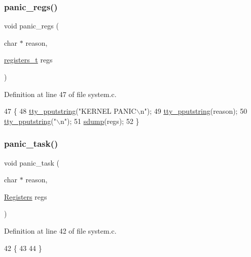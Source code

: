 \subsubsection{\texorpdfstring{panic\+\_\+regs()}{panic\_regs()}}
{\footnotesize\ttfamily void panic\+\_\+regs (\begin{DoxyParamCaption}\item[{char $\ast$}]{reason,  }\item[{\hyperlink{a00104_adf58dbaf6139b4957c348711f2026957_adf58dbaf6139b4957c348711f2026957}{registers\+\_\+t}}]{regs }\end{DoxyParamCaption})}



Definition at line 47 of file system.\+c.


\begin{DoxyCode}
47                                                 \{
48   \hyperlink{a00149_ade960b1320324706aac6c00cc6b1b2fe_ade960b1320324706aac6c00cc6b1b2fe}{tty\_pputstring}(\textcolor{stringliteral}{"KERNEL PANIC\(\backslash\)n"});
49   \hyperlink{a00149_ade960b1320324706aac6c00cc6b1b2fe_ade960b1320324706aac6c00cc6b1b2fe}{tty\_pputstring}(reason);
50   \hyperlink{a00149_ade960b1320324706aac6c00cc6b1b2fe_ade960b1320324706aac6c00cc6b1b2fe}{tty\_pputstring}(\textcolor{stringliteral}{"\(\backslash\)n"});
51   \hyperlink{a00101_a4b4233daef6e041e7278cae2b21b5ed4_a4b4233daef6e041e7278cae2b21b5ed4}{sdump}(regs);
52 \}
\end{DoxyCode}
\mbox{\label{a00119_ab8a927fdcddb96915c7f185e2a5db4da_ab8a927fdcddb96915c7f185e2a5db4da}} 
\subsubsection{\texorpdfstring{panic\+\_\+task()}{panic\_task()}}
{\footnotesize\ttfamily void panic\+\_\+task (\begin{DoxyParamCaption}\item[{char $\ast$}]{reason,  }\item[{\hyperlink{a00234}{Registers}}]{regs }\end{DoxyParamCaption})}



Definition at line 42 of file system.\+c.


\begin{DoxyCode}
42                                               \{
43 
44 \}
\end{DoxyCode}
\mbox{\label{a00119_a353956c1fd65c7ed787836534fc9354e_a353956c1fd65c7ed787836534fc9354e}} 
